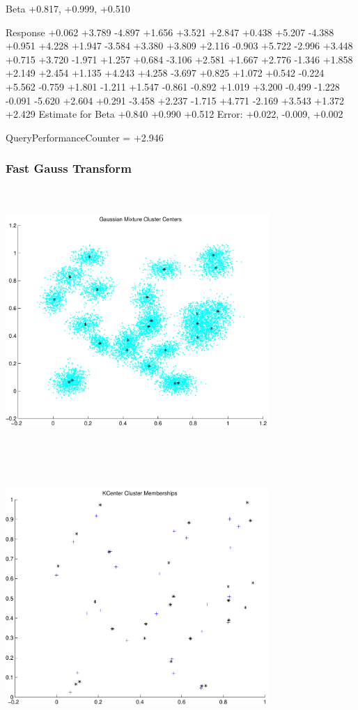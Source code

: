 \documentclass[9pt]{article}
\theoremstyle{plain}
\theoremstyle{definition}
\theoremstyle{remark}
\numberwithin{equation}{section}
\begin{document}
Beta
+0.817, +0.999, +0.510

Response
+0.062
+3.789
-4.897
+1.656
+3.521
+2.847
+0.438
+5.207
-4.388
+0.951
+4.228
+1.947
-3.584
+3.380
+3.809
+2.116
-0.903
+5.722
-2.996
+3.448
+0.715
+3.720
-1.971
+1.257
+0.684
-3.106
+2.581
+1.667
+2.776
-1.346
+1.858
+2.149
+2.454
+1.135
+4.243
+4.258
-3.697
+0.825
+1.072
+0.542
-0.224
+5.562
-0.759
+1.801
-1.211
+1.547
-0.861
-0.892
+1.019
+3.200
-0.499
-1.228
-0.091
-5.620
+2.604
+0.291
-3.458
+2.237
-1.715
+4.771
-2.169
+3.543
+1.372
+2.429
Estimate for Beta
+0.840
+0.990
+0.512
Error:
+0.022, -0.009, +0.002


QueryPerformanceCounter  =  +2.946
\subsubsection{Fast Gauss Transform}
\includegraphics[width=10.0cm,height=10.0cm]{GaussianMixture_ClusterCenters25_Centers.pdf}

\includegraphics[width=10.0cm,height=10.0cm]{KCenterClusterMemberships_25_Centers.pdf}
\end{document}

